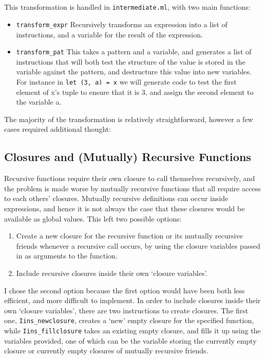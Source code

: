 \documentclass[12pt,twoside,notitlepage]{report}
\newcommand{\textinline}{\texttt}
\newcommand{\camlinline}{\texttt}
\begin{document}
\\\\
This transformation is handled in \textinline{intermediate.ml}, with two main functions:
\begin{itemize}
	\item \camlinline{transform_expr} Recursively transforms an expression into a list of instructions, and a variable for the result of the expression.
	\item \camlinline{transform_pat} This takes a pattern and a variable, and generates a list of instructions that will both test the structure of the value is stored in the variable against the pattern, and destructure this value into new variables. For instance in \camlinline{let (3, a) = x} we will generate code to test the first element of x's tuple to ensure that it is 3, and assign the second element to the variable a.
\end{itemize}
The majority of the transformation is relatively straightforward, however a few cases required additional thought:

\subsection{Closures and (Mutually) Recursive Functions}
Recursive functions require their own closure to call themselves recursively, and the problem is made worse by mutually recursive functions that all require access to each others' closures. Mutually recursive definitions can occur inside expressions, and hence it is not always the case that these closures would be available as global values. This left two possible options:
\begin{enumerate}
	\item Create a new closure for the recursive function or its mutually recursive friends whenever a recursive call occurs, by using the closure variables passed in as arguments to the function.
	\item Include recursive closures inside their own `closure variables'.
\end{enumerate}
I chose the second option because the first option would have been both less efficient, and more difficult to implement. In order to include closures inside their own `closure variables', there are two instructions to create closures. The first one, \textinline{Iins_newclosure}, creates a `new' empty closure for the specified function, while \textinline{Iins_fillclosure} takes an existing empty closure, and fills it up using the variables provided, one of which can be the variable storing the currently empty closure or currently empty closures of mutually recursive friends.
\end{document}
